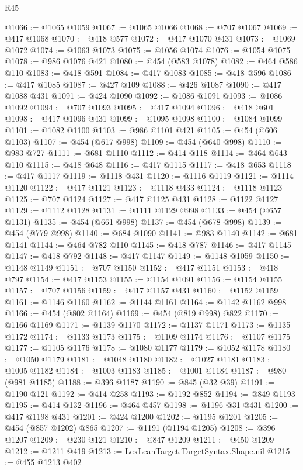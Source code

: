 \begin{lexlean}{R45}
\begin{coremodule}
@1066 := @1065 @1059
@1067 := @1065 @1066
@1068 := @707 @1067
@1069 := @417 @1068
@1070 := @418 @577
@1072 := @417 @1070 @431
@1073 := @1069 @1072
@1074 := @1063 @1073
@1075 := @1056 @1074
@1076 := @1054 @1075
@1078 := @986 @1076 @421
@1080 := @454 (@583 @1078)
@1082 := @464 @586 @110
@1083 := @418 @591
@1084 := @417 @1083
@1085 := @418 @596
@1086 := @417 @1085
@1087 := @427 @109
@1088 := @426 @1087
@1090 := @417 @1088 @431
@1091 := @424 @1090
@1092 := @1086 @1091
@1093 := @1086 @1092
@1094 := @707 @1093
@1095 := @417 @1094
@1096 := @418 @601
@1098 := @417 @1096 @431
@1099 := @1095 @1098
@1100 := @1084 @1099
@1101 := @1082 @1100
@1103 := @986 @1101 @421
@1105 := @454 (@606 @1103)
@1107 := @454 (@617 @998)
@1109 := @454 (@640 @998)
@1110 := @983 @727
@1111 := @681 @1110
@1112 := @414 @118
@1114 := @464 @643 @110
@1115 := @418 @648
@1116 := @417 @1115
@1117 := @418 @653
@1118 := @417 @1117
@1119 := @1118 @431
@1120 := @1116 @1119
@1121 := @1114 @1120
@1122 := @417 @1121
@1123 := @1118 @433
@1124 := @1118 @1123
@1125 := @707 @1124
@1127 := @417 @1125 @431
@1128 := @1122 @1127
@1129 := @1112 @1128
@1131 := @1111 @1129 @998
@1133 := @454 (@657 @1131)
@1135 := @454 (@661 @998)
@1137 := @454 (@678 @998)
@1139 := @454 (@779 @998)
@1140 := @684 @1090
@1141 := @983 @1140
@1142 := @681 @1141
@1144 := @464 @782 @110
@1145 := @418 @787
@1146 := @417 @1145
@1147 := @418 @792
@1148 := @417 @1147
@1149 := @1148 @1059
@1150 := @1148 @1149
@1151 := @707 @1150
@1152 := @417 @1151
@1153 := @418 @797
@1154 := @417 @1153
@1155 := @1154 @1091
@1156 := @1154 @1155
@1157 := @707 @1156
@1159 := @417 @1157 @431
@1160 := @1152 @1159
@1161 := @1146 @1160
@1162 := @1144 @1161
@1164 := @1142 @1162 @998
@1166 := @454 (@802 @1164)
@1169 := @454 (@819 @998) @822
@1170 := @1166 @1169
@1171 := @1139 @1170
@1172 := @1137 @1171
@1173 := @1135 @1172
@1174 := @1133 @1173
@1175 := @1109 @1174
@1176 := @1107 @1175
@1177 := @1105 @1176
@1178 := @1080 @1177
@1179 := @1052 @1178
@1180 := @1050 @1179
@1181 := @1048 @1180
@1182 := @1027 @1181
@1183 := @1005 @1182
@1184 := @1003 @1183
@1185 := @1001 @1184
@1187 := @980 (@981 @1185)
@1188 := @396 @1187
@1190 := @845 (@32 @39)
@1191 := @1190 @121
@1192 := @414 @258
@1193 := @1192 @852
@1194 := @849 @1193
@1195 := @414 @132
@1196 := @464 @457
@1198 := @1196 @31 @431
@1200 := @417 @1198 @431
@1201 := @424 @1200
@1202 := @1195 @1201
@1205 := @454 (@857 @1202) @865
@1207 := @1191 (@1194 @1205)
@1208 := @396 @1207
@1209 := @230 @121
@1210 := @847 @1209
@1211 := @450 @1209
@1212 := @1211 @419
@1213 := LexLeanTarget.TargetSyntax.Shape.nil
@1215 := @455 @1213 @402

\end{coremodule}
\end{lexlean}
